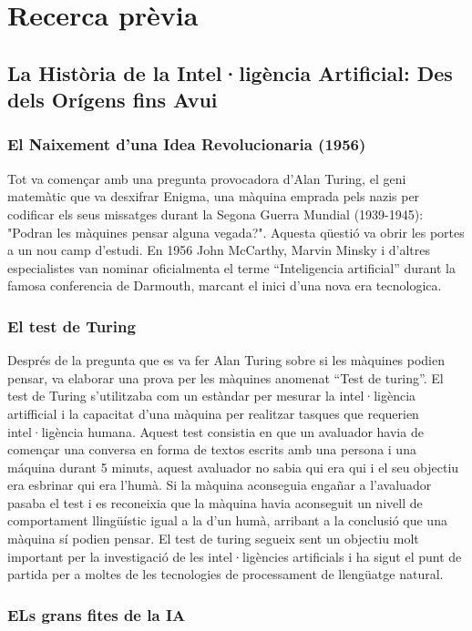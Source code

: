 \chapter{Recerca prèvia}
\label{c:intro}
\section{La Història de la Intel·ligència Artificial: Des dels Orígens fins Avui}
\subsection{El Naixement d'una Idea Revolucionaria (1956)}
Tot va començar amb una pregunta provocadora d’Alan Turing, el geni matemàtic que va desxifrar Enigma, una màquina emprada pels nazis per codificar els seus missatges durant la Segona Guerra Mundial (1939-1945): "Podran les màquines pensar alguna vegada?". Aquesta qüestió va obrir les portes a un nou camp d’estudi. En 1956 John McCarthy, Marvin Minsky i d'altres especialistes van nominar oficialmenta el terme ``Inteligencia artificial'' durant la famosa conferencia de Darmouth, marcant el inici d'una nova era tecnologica.
\subsection{El test de Turing}
Després de la pregunta que es va fer Alan Turing sobre si les màquines podien pensar, va elaborar una prova per les màquines anomenat ``Test de turing''.
El test de Turing s'utilitzaba com un estàndar per mesurar la intel·ligència artifficial i la capacitat d'una màquina per realitzar tasques que requerien intel·ligència humana.
Aquest test consistia en que un avaluador havia de començar una conversa en forma de textos escrits amb una persona i una máquina durant 5 minuts, aquest avaluador no sabia qui era qui i el seu objectiu era esbrinar qui era l'humà. Si la màquina aconseguia engañar a l'avaluador pasaba el test i es reconeixia que la màquina havia aconseguit un nivell de comportament llingüístic igual a la d'un humà, arribant a la conclusió que una màquina sí podien pensar.
El test de turing segueix sent un objectiu molt important per la investigació de les intel·ligències artificials i ha sigut el punt de partida per a moltes de les tecnologies de processament de llengüatge natural.

\subsection{ELs grans fites de la IA}
